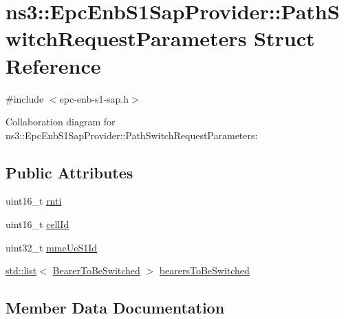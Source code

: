 \hypertarget{structns3_1_1EpcEnbS1SapProvider_1_1PathSwitchRequestParameters}{}\section{ns3\+:\+:Epc\+Enb\+S1\+Sap\+Provider\+:\+:Path\+Switch\+Request\+Parameters Struct Reference}
\label{structns3_1_1EpcEnbS1SapProvider_1_1PathSwitchRequestParameters}


{\ttfamily \#include $<$epc-\/enb-\/s1-\/sap.\+h$>$}



Collaboration diagram for ns3\+:\+:Epc\+Enb\+S1\+Sap\+Provider\+:\+:Path\+Switch\+Request\+Parameters\+:
\subsection*{Public Attributes}
\begin{DoxyCompactItemize}
\item 
uint16\+\_\+t \hyperlink{structns3_1_1EpcEnbS1SapProvider_1_1PathSwitchRequestParameters_af3d5af75bafaaa38ea23e76cff63ab11}{rnti}
\item 
uint16\+\_\+t \hyperlink{structns3_1_1EpcEnbS1SapProvider_1_1PathSwitchRequestParameters_adf851b4f19693c0e10707f8ec1ce5c0e}{cell\+Id}
\item 
uint32\+\_\+t \hyperlink{structns3_1_1EpcEnbS1SapProvider_1_1PathSwitchRequestParameters_ad699e2ebb160147cb5c044ccc522e042}{mme\+Ue\+S1\+Id}
\item 
\hyperlink{openflow-interface_8h_afd9bcfa176617760671b67580f536fa7}{std\+::list}$<$ \hyperlink{structns3_1_1EpcEnbS1SapProvider_1_1BearerToBeSwitched}{Bearer\+To\+Be\+Switched} $>$ \hyperlink{structns3_1_1EpcEnbS1SapProvider_1_1PathSwitchRequestParameters_a0d7a35c5b7115b333931241e4125ebc8}{bearers\+To\+Be\+Switched}
\end{DoxyCompactItemize}


\subsection{Member Data Documentation}
